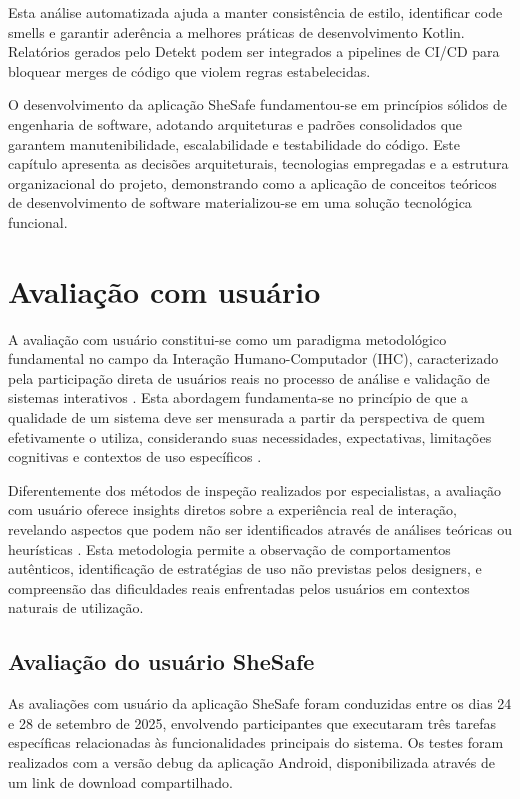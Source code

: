 Esta análise automatizada ajuda a manter consistência de estilo, identificar code smells e garantir aderência a melhores práticas de desenvolvimento Kotlin. Relatórios gerados pelo Detekt podem ser integrados a pipelines de CI/CD para bloquear merges de código que violem regras estabelecidas.

O desenvolvimento da aplicação SheSafe fundamentou-se em princípios sólidos de engenharia de software, adotando arquiteturas e padrões consolidados que garantem manutenibilidade, escalabilidade e testabilidade do código. Este capítulo apresenta as decisões arquiteturais, tecnologias empregadas e a estrutura organizacional do projeto, demonstrando como a aplicação de conceitos teóricos de desenvolvimento de software materializou-se em uma solução tecnológica funcional.

\section{Avaliação com usuário}
A avaliação com usuário constitui-se como um paradigma metodológico fundamental no campo da Interação Humano-Computador (IHC), caracterizado pela participação direta de usuários reais no processo de análise e validação de sistemas interativos \cite{dix2003human}. Esta abordagem fundamenta-se no princípio de que a qualidade de um sistema deve ser mensurada a partir da perspectiva de quem efetivamente o utiliza, considerando suas necessidades, expectativas, limitações cognitivas e contextos de uso específicos \cite{preece2015interaction}.

Diferentemente dos métodos de inspeção realizados por especialistas, a avaliação com usuário oferece insights diretos sobre a experiência real de interação, revelando aspectos que podem não ser identificados através de análises teóricas ou heurísticas \cite{nielsen1994usability}. Esta metodologia permite a observação de comportamentos autênticos, identificação de estratégias de uso não previstas pelos designers, e compreensão das dificuldades reais enfrentadas pelos usuários em contextos naturais de utilização.
\subsection{Avaliação do usuário SheSafe}

As avaliações com usuário da aplicação SheSafe foram conduzidas entre os dias 24 e 28 de setembro de 2025, envolvendo participantes que executaram três tarefas específicas relacionadas às funcionalidades principais do sistema. Os testes foram realizados com a versão debug da aplicação Android, disponibilizada através de um link de download compartilhado.

